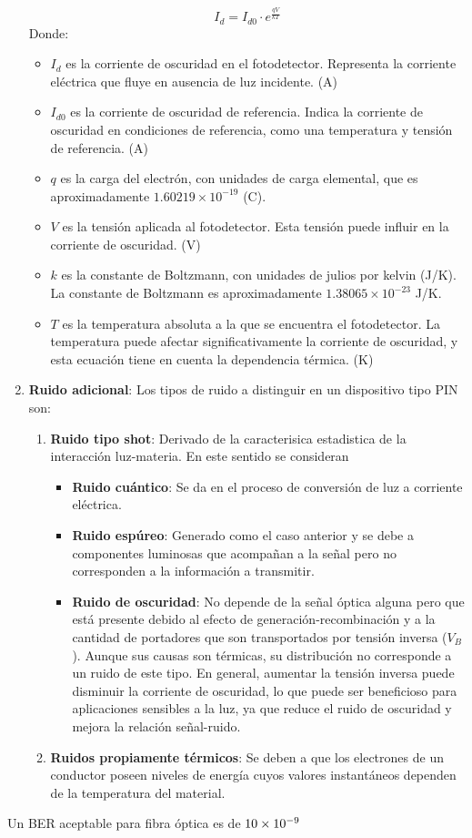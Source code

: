 \documentclass[
	12pt, %
	fleqn, %
	a4paper, %
	oneside, %
]{LegrandOrangeBook}
\begin{document}
\begin{enumerate}
\begin{equation}
I_d = I_{d0} \cdot e^{\frac{qV}{kT}}
\end{equation}
Donde:
\begin{itemize}
   \item \(I_d\) es la corriente de oscuridad en el fotodetector. Representa la corriente eléctrica que fluye en ausencia de luz incidente. (A)
  \item \(I_{d0}\) es la corriente de oscuridad de referencia. Indica la corriente de oscuridad en condiciones de referencia, como una temperatura y tensión de referencia. (A)
  \item \(q\) es la carga del electrón, con unidades de carga elemental, que es aproximadamente \(1.60219 \times 10^{-19}\) (C).
  \item \(V\) es la tensión aplicada al fotodetector. Esta tensión puede influir en la corriente de oscuridad. (V)
  \item \(k\) es la constante de Boltzmann, con unidades de julios por kelvin (J/K). La constante de Boltzmann es aproximadamente \(1.38065 \times 10^{-23}\) J/K.
  \item \(T\) es la temperatura absoluta a la que se encuentra el fotodetector. La temperatura puede afectar significativamente la corriente de oscuridad, y esta ecuación tiene en cuenta la dependencia térmica. (K)
\end{itemize}
\item \textbf{Ruido adicional}: Los tipos de ruido a distinguir en un dispositivo tipo PIN son:
\begin{enumerate}
\item \textbf{Ruido tipo shot}: Derivado de la caracterisica estadistica de la interacción luz-materia. En este sentido se consideran
\begin{itemize}
\item \textbf{Ruido cuántico}: Se da en el proceso de conversión de luz a corriente eléctrica.
\item \textbf{Ruido espúreo}: Generado como el caso anterior y se debe a componentes luminosas que acompañan a la señal pero no corresponden a la información a transmitir.
\item \textbf{Ruido de oscuridad}: No depende de la señal óptica alguna pero que está presente debido al efecto de generación-recombinación y a la cantidad de portadores que son transportados por tensión inversa ($V_B$). Aunque sus causas son térmicas, su distribución no corresponde a un ruido de este tipo. En general, aumentar la tensión inversa puede disminuir la corriente de oscuridad, lo que puede ser beneficioso para aplicaciones sensibles a la luz, ya que reduce el ruido de oscuridad y mejora la relación señal-ruido.
\end{itemize}
\item \textbf{Ruidos propiamente térmicos}: Se deben a que los electrones de un conductor poseen niveles de energía cuyos valores instantáneos dependen de la temperatura del material.
\end{enumerate}
\end{enumerate}
\begin{remark}
Un BER aceptable para fibra óptica es de $10\times 10^{-9}$
\end{remark}
\end{document}
